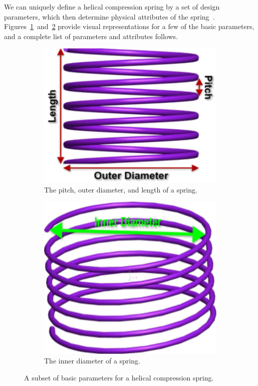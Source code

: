 \documentclass[10pt]{article}
\begin{document}
We can uniquely define a helical compression spring by a set of design parameters, which then determine physical attributes of the spring~\cite{Massad2015}. Figures~\ref{fig:Description1}~and~\ref{fig:Description2} provide visual representations for a few of the basic parameters, and a complete list of parameters and attributes follows. 		 
		\begin{figure}[h]
			\begin{subfigure}{.5\textwidth}
				\centering
				\includegraphics[scale=.17]{Spring_Description.png}
				\caption{The pitch, outer diameter, and length of a spring.}
				\label{fig:Description1}
			\end{subfigure}%
			\begin{subfigure}{.5\textwidth}
				  \centering
		 		\includegraphics[scale=.15]{Spring_Description2.png}
				\caption{The inner diameter of a spring.}
				  \label{fig:Description2}
		  		
			\end{subfigure}
			 \label{fig:Descriptions}
		  \caption{A subset of basic parameters for a helical compression spring.}
		\end{figure}
		
\end{document}
